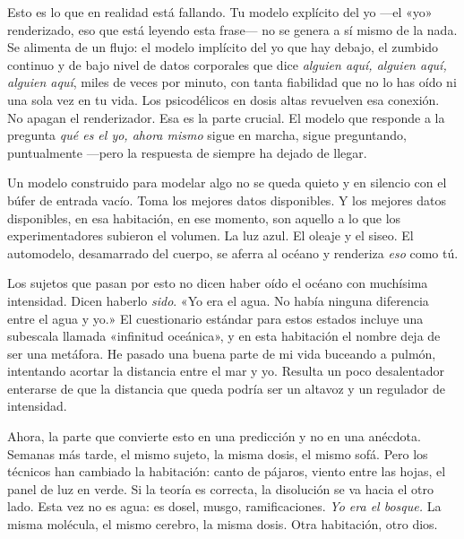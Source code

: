 \documentclass[11pt, twoside, openright]{book}
\begin{document}
Esto es lo que en realidad está fallando. Tu modelo explícito del yo ---el «yo» renderizado, eso que está leyendo esta frase--- no se genera a sí mismo de la nada. Se alimenta de un flujo: el modelo implícito del yo que hay debajo, el zumbido continuo y de bajo nivel de datos corporales que dice \textit{alguien aquí, alguien aquí, alguien aquí}, miles de veces por minuto, con tanta fiabilidad que no lo has oído ni una sola vez en tu vida. Los psicodélicos en dosis altas revuelven esa conexión. No apagan el renderizador. Esa es la parte crucial. El modelo que responde a la pregunta \textit{qué es el yo, ahora mismo} sigue en marcha, sigue preguntando, puntualmente ---pero la respuesta de siempre ha dejado de llegar.

Un modelo construido para modelar algo no se queda quieto y en silencio con el búfer de entrada vacío. Toma los mejores datos disponibles. Y los mejores datos disponibles, en esa habitación, en ese momento, son aquello a lo que los experimentadores subieron el volumen. La luz azul. El oleaje y el siseo. El automodelo, desamarrado del cuerpo, se aferra al océano y renderiza \textit{eso} como tú.

Los sujetos que pasan por esto no dicen haber oído el océano con muchísima intensidad. Dicen haberlo \textit{sido}. «Yo era el agua. No había ninguna diferencia entre el agua y yo.» El cuestionario estándar para estos estados incluye una subescala llamada «infinitud oceánica», y en esta habitación el nombre deja de ser una metáfora. He pasado una buena parte de mi vida buceando a pulmón, intentando acortar la distancia entre el mar y yo. Resulta un poco desalentador enterarse de que la distancia que queda podría ser un altavoz y un regulador de intensidad.

Ahora, la parte que convierte esto en una predicción y no en una anécdota. Semanas más tarde, el mismo sujeto, la misma dosis, el mismo sofá. Pero los técnicos han cambiado la habitación: canto de pájaros, viento entre las hojas, el panel de luz en verde. Si la teoría es correcta, la disolución se va hacia el otro lado. Esta vez no es agua: es dosel, musgo, ramificaciones. \textit{Yo era el bosque.} La misma molécula, el mismo cerebro, la misma dosis. Otra habitación, otro dios.
\end{document}
